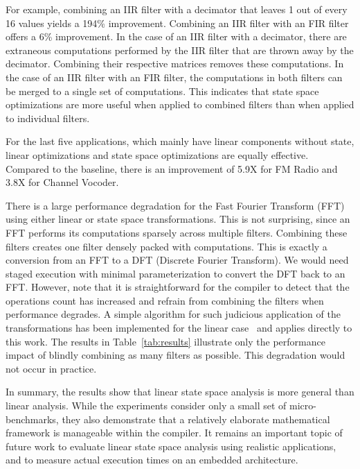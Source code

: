 For example, combining an IIR filter with a decimator that leaves 1
out of every 16 values yields a 194\% improvement. Combining an IIR
filter with an FIR filter offers a 6\% improvement. In the case of an
IIR filter with a decimator, there are extraneous computations
performed by the IIR filter that are thrown away by the decimator.
Combining their respective matrices removes these computations. In the
case of an IIR filter with an FIR filter, the computations in both
filters can be merged to a single set of computations. This indicates
that state space optimizations are more useful when applied to
combined filters than when applied to individual filters.

For the last five applications, which mainly have linear components
without state, linear optimizations and state space optimizations are
equally effective.  Compared to the baseline, there is an improvement
of 5.9X for FM Radio and 3.8X for Channel Vocoder.

There is a large performance degradation for the Fast Fourier
Transform (FFT) using either linear or state space transformations.
This is not surprising, since an FFT performs its computations
sparsely across multiple filters.  Combining these filters creates one
filter densely packed with computations.  This is exactly a conversion
from an FFT to a DFT (Discrete Fourier Transform).  We would need
staged execution with minimal parameterization to convert the DFT back
to an FFT.  However, note that it is straightforward for the compiler
to detect that the operations count has increased and refrain from
combining the filters when performance degrades.  A simple algorithm
for such judicious application of the transformations has been
implemented for the linear case~\cite{Lamb} and applies directly to
this work.  The results in Table~\ref{tab:results} illustrate only the
performance impact of blindly combining as many filters as possible.
This degradation would not occur in practice.

In summary, the results show that linear state space analysis is more
general than linear analysis.  While the experiments consider only a
small set of micro-benchmarks, they also demonstrate that a relatively
elaborate mathematical framework is manageable within the compiler.  It
remains an important topic of future work to evaluate linear state
space analysis using realistic applications, and to measure actual
execution times on an embedded architecture.
